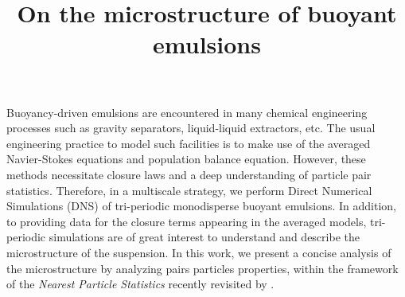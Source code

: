 \documentclass[9pt,a4paper]{article}
\begin{document}
\title{On the microstructure of buoyant emulsions}
%
%

%

\maketitle


\begin{summary}
    Buoyancy-driven emulsions are encountered in many chemical engineering processes such as gravity separators, liquid-liquid extractors, etc. The usual engineering practice to model such facilities is to make use of the averaged Navier-Stokes equations and population balance equation. 
    However, these methods necessitate closure laws and a deep understanding of particle pair statistics.
    Therefore, in a multiscale strategy, we perform Direct Numerical Simulations (DNS) of tri-periodic monodisperse buoyant emulsions.
    In addition, to providing data for the closure terms appearing in the averaged models, tri-periodic simulations are of great interest to understand and describe the microstructure of the suspension. 
    In this work, we present a concise analysis of the microstructure by analyzing pairs particles properties, within the framework of the \textit{Nearest Particle Statistics} recently revisited by \cite{zhang2021ensemble}. 
\end{summary}
\end{document}
